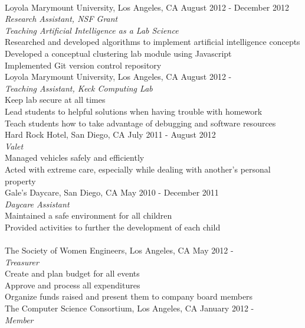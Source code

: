 \documentclass[10.5pt]{article}
\begin{document}
\vspace{1.5mm}\\
\indent Loyola Marymount University, Los Angeles, CA \hfill August 2012 - December 2012\\
\indent \emph{Research Assistant, NSF Grant}\\
\indent \indent \emph{Teaching Artificial Intelligence as a Lab Science}\\
\indent \indent Researched and developed algorithms to implement artificial intelligence concepts\\
\indent \indent Developed a conceptual clustering lab module using Javascript\\
\indent \indent Implemented Git version control repository\vspace{2mm}\\
\indent Loyola Marymount University, Los Angeles, CA \hfill August 2012 -\\
\indent \emph{Teaching Assistant, Keck Computing Lab}\\
\indent \indent Keep lab secure at all times\\
\indent \indent Lead students to helpful solutions when having trouble with homework\\
\indent \indent Teach students how to take advantage of debugging and software resources\vspace{2mm}\\
\indent Hard Rock Hotel, San Diego, CA \hfill July 2011 - August 2012\\
\indent \emph{Valet}\\
\indent \indent Managed vehicles safely and efficiently\\
\indent \indent Acted with extreme care, especially while dealing with another's personal property\\ 	
\indent Gale’s Daycare, San Diego, CA \hfill May 2010 - December 2011\\
\indent \emph{Daycare Assistant}\\
\indent \indent Maintained a safe environment for all children\\
\indent \indent Provided activities to further the development of each child\\

\vspace{1.5mm}\\
\indent The Society of Women Engineers, Los Angeles, CA \hfill May 2012 -\\
\indent \emph{Treasurer}\\
\indent \indent Create and plan budget for all events\\
\indent \indent Approve and process all expenditures\\
\indent \indent Organize funds raised and present them to company board members\vspace{2mm}\\
\indent The Computer Science Consortium, Los Angeles, CA \hfill January 2012 -\\
\indent \emph{Member}
\end{document}
